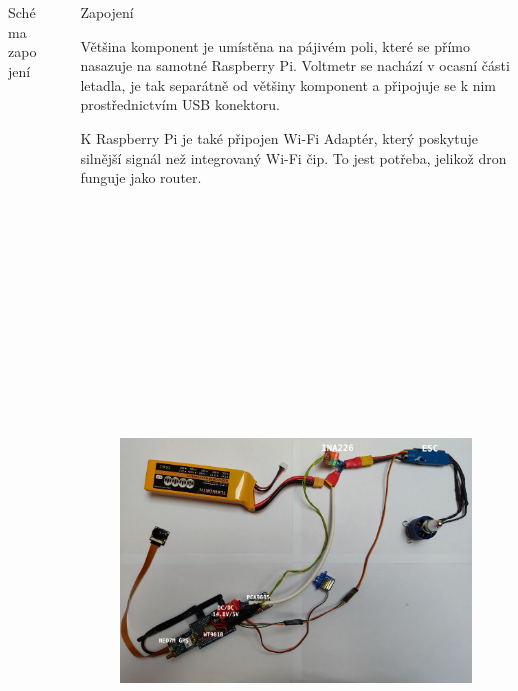\documentclass[final]{beamer}
\newlength{\sepwidth}
\newlength{\colwidth}
\newcommand{\separatorcolumn}{\begin{column}{\sepwidth}\end{column}}
\begin{document}
\begin{frame}[t]
\begin{columns}[t]
\begin{column}{\colwidth}
\begin{block}{Schéma zapojení}
      \end{block}

    \end{column}

    \separatorcolumn

    \begin{column}{\colwidth}

			\begin{block}{Zapojení}

				Většina komponent je umístěna na pájivém poli, které se přímo nasazuje na samotné Raspberry Pi.
				Voltmetr se nachází v ocasní části letadla, je tak separátně od většiny komponent a připojuje se k nim prostřednictvím USB konektoru.

				K Raspberry Pi je také připojen Wi-Fi Adaptér, který poskytuje silnější signál než integrovaný Wi-Fi čip.
				To jest potřeba, jelikož dron funguje jako router.

				\begin{figure}[h]
					\centering
					\includegraphics[height=19cm]{../img/circuit.jpg}
				\end{figure}


\end{block}
\end{column}
\end{columns}
\end{frame}
\end{document}
